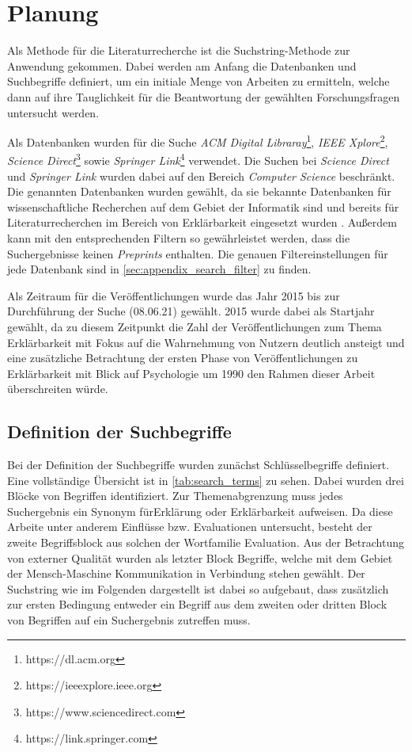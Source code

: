 \section{Planung}

Als Methode für die Literaturrecherche ist die Suchstring-Methode zur Anwendung gekommen. Dabei werden am Anfang die Datenbanken und Suchbegriffe definiert, um ein initiale Menge von Arbeiten zu ermitteln, welche dann auf ihre Tauglichkeit für die Beantwortung der gewählten Forschungsfragen untersucht werden.

Als Datenbanken wurden für die Suche \textit{ACM Digital Libraray}\footnote{https://dl.acm.org}, \textit{IEEE Xplore}\footnote{https://ieeexplore.ieee.org}, \textit{Science Direct}\footnote{https://www.sciencedirect.com} sowie \textit{Springer Link}\footnote{https://link.springer.com} verwendet. Die Suchen bei \textit{Science Direct} und \textit{Springer Link} wurden dabei auf den Bereich \textit{Computer Science} beschränkt. Die genannten Datenbanken wurden gewählt, da sie bekannte Datenbanken für wissenschaftliche Recherchen auf dem Gebiet der Informatik sind \cite{carvalho2017quality} und bereits für Literaturrecherchen im Bereich von Erklärbarkeit eingesetzt wurden \cite{nunes_systematic_2017}. Außerdem kann mit den entsprechenden Filtern so gewährleistet werden, dass die Suchergebnisse keinen \textit{Preprints} enthalten. Die genauen Filtereinstellungen für jede Datenbank sind in \autoref{sec:appendix_search_filter} zu finden.

Als Zeitraum für die Veröffentlichungen wurde das Jahr 2015 bis zur Durchführung der Suche (08.06.21) gewählt. 2015 wurde dabei als Startjahr gewählt, da zu diesem Zeitpunkt die Zahl der Veröffentlichungen zum Thema Erklärbarkeit mit Fokus auf die Wahrnehmung von Nutzern deutlich ansteigt und eine zusätzliche Betrachtung der ersten Phase von Veröffentlichungen zu Erklärbarkeit mit Blick auf Psychologie um 1990 den Rahmen dieser Arbeit überschreiten würde.

\subsection{Definition der Suchbegriffe}

Bei der Definition der Suchbegriffe wurden zunächst Schlüsselbegriffe definiert. Eine vollständige Übersicht ist in \autoref{tab:search_terms} zu sehen. Dabei wurden drei Blöcke von Begriffen identifiziert. Zur Themenabgrenzung muss jedes Suchergebnis ein Synonym für\glqq Erklärung\grqq{} oder \glqq Erklärbarkeit\grqq{} aufweisen. Da diese Arbeite unter anderem Einflüsse bzw. Evaluationen untersucht, besteht der zweite Begriffsblock aus solchen der Wortfamilie \glqq Evaluation\grqq{}. Aus der Betrachtung von externer Qualität wurden als letzter Block Begriffe, welche mit dem Gebiet der Mensch-Maschine Kommunikation in Verbindung stehen gewählt. Der Suchstring wie im Folgenden dargestellt ist dabei so aufgebaut, dass zusätzlich zur ersten Bedingung entweder ein Begriff aus dem zweiten oder dritten Block von Begriffen auf ein Suchergebnis zutreffen muss.


